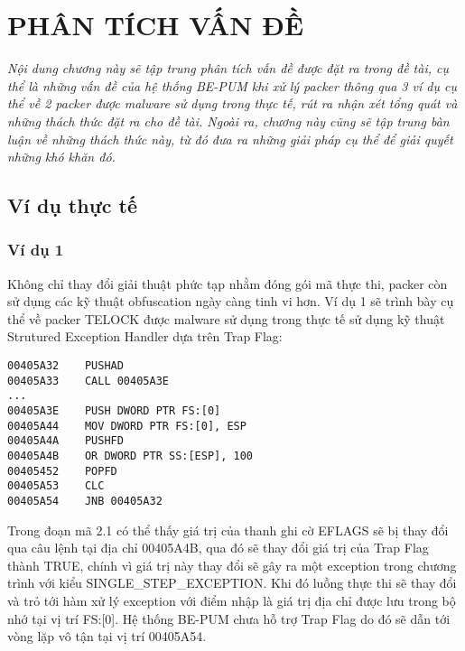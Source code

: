 
\newpage
\chapter{PHÂN TÍCH VẤN ĐỀ}

\begin{concept}[15cm]
\textit{Nội dung chương này sẽ tập trung phân tích vấn đề được đặt ra trong đề tài, cụ thể là những vấn đề của hệ thống BE-PUM khi xử lý packer thông qua 3 ví dụ cụ thể về 2 packer được malware sử dụng trong thực tế, rút ra nhận xét tổng quát và những thách thức đặt ra cho đề tài. Ngoài ra, chương này cũng sẽ tập trung bàn luận về những thách thức này, từ đó đưa ra những giải pháp cụ thể để giải quyết những khó khăn đó.}
\end{concept}

\section{Ví dụ thực tế}

\subsection{Ví dụ 1}

\hspace{0.5cm}Không chỉ thay đổi giải thuật phức tạp nhằm đóng gói mã thực thi, packer còn sử dụng các kỹ thuật obfuscation ngày càng tinh vi hơn. Ví dụ 1 sẽ trình bày cụ thể về packer TELOCK được malware sử dụng trong thực tế sử dụng kỹ thuật Strutured Exception Handler dựa trên Trap Flag:

\begin{code}
\begin{lstlisting}[captionpos=b,caption={Kỹ thuật Strutured Exception Handler sử dụng trong packer TELOCK},frame=single]
00405A32	PUSHAD
00405A33	CALL 00405A3E
...
00405A3E	PUSH DWORD PTR FS:[0] 
00405A44	MOV DWORD PTR FS:[0], ESP
00405A4A	PUSHFD
00405A4B	OR DWORD PTR SS:[ESP], 100
00405452	POPFD
00405A53	CLC
00405A54	JNB 00405A32
\end{lstlisting}
\end{code}

\hspace{0.5cm}Trong đoạn mã 2.1 có thể thấy giá trị của thanh ghi cờ EFLAGS sẽ bị thay đổi qua câu lệnh tại địa chỉ 00405A4B, qua đó sẽ thay đổi giá trị của Trap Flag thành TRUE, chính vì giá trị này thay đổi sẽ gây ra một exception trong chương trình với kiểu SINGLE\_STEP\_EXCEPTION. Khi đó luồng thực thi sẽ thay đổi và trỏ tới hàm xử lý exception với điểm nhập là giá trị địa chỉ được lưu trong bộ nhớ tại vị trí FS:[0]. Hệ thống BE-PUM chưa hỗ trợ Trap Flag do đó sẽ dẫn tới vòng lặp vô tận tại vị trí 00405A54.

